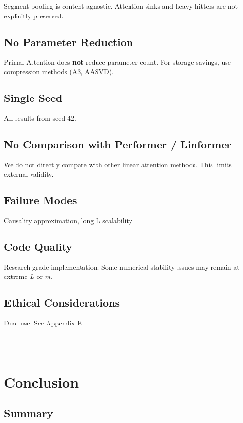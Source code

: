 Segment pooling is content-agnostic. Attention sinks and heavy hitters are 
not explicitly preserved.

\subsection{No Parameter Reduction}

Primal Attention does \textbf{not} reduce parameter count. For storage savings, 
use compression methods (A3, AASVD).

\subsection{Single Seed}

All results from seed 42.

\subsection{No Comparison with Performer / Linformer}

We do not directly compare with other linear attention methods. This limits 
external validity.

\subsection{Failure Modes}

Causality approximation, long L scalability

\subsection{Code Quality}

Research-grade implementation. Some numerical stability issues may remain 
at extreme $L$ or $m$.

\subsection{Ethical Considerations}

Dual-use. See Appendix E.
\begin{lstlisting}

---
\end{lstlisting}


\section{Conclusion}

\subsection{Summary}

